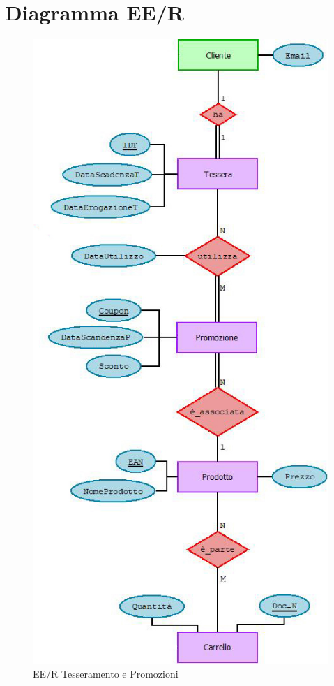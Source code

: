 \documentclass[12pt]{report}
\begin{document}
 
\newpage


\section{Diagramma EE/R}



\begin{figure}[H]
\centering
\includegraphics[scale=0.8]{imgs/eer_cliente.jpeg}
\caption{EE/R Tesseramento e Promozioni}
\end{figure}
\end{document}
